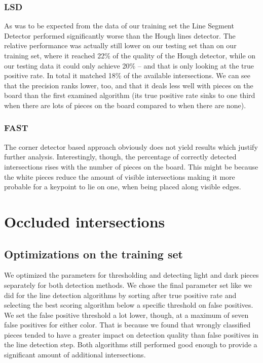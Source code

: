 	\subsubsection{LSD}
	\label{evaluation-visible-performance-lsd}
	As was to be expected from the data of our training set the Line Segment Detector performed significantly worse than the Hough lines detector. The relative performance was actually still lower on our testing set than on our training set, where it reached 22\% of the quality of the Hough detector, while on our testing data it could only achieve 20\% -- and that is only looking at the true positive rate. In total it matched 18\% of the available intersections. We can see that the precision ranks lower, too, and that it deals less well with pieces on the board than the first examined algorithm (its true positive rate sinks to one third when there are lots of pieces on the board compared to when there are none).

	\subsubsection{FAST}
	\label{evaluation-visible-performance-fast}
	The corner detector based approach obviously does not yield results which justify further analysis. Interestingly, though, the percentage of correctly detected intersections rises with the number of pieces on the board. This might be because the white pieces reduce the amount of visible intersections making it more probable for a keypoint to lie on one, when being placed along visible edges.

	





	\section{Occluded intersections}
	\label{evaluation-occluded}
	\subsection{Optimizations on the training set}
	\label{evaluation-occluded-optimization}
	We optimized the parameters for thresholding and detecting light and dark pieces separately for both detection methods. We chose the final parameter set like we did for the line detection algorithms by sorting after true positive rate and selecting the best scoring algorithm below a specific threshold on false positives. We set the false positive threshold a lot lower, though, at a maximum of seven false positives for either color. That is because we found that wrongly classified pieces tended to have a greater impact on detection quality than false positives in the line detection step. Both algorithms still performed good enough to provide a significant amount of additional intersections.

